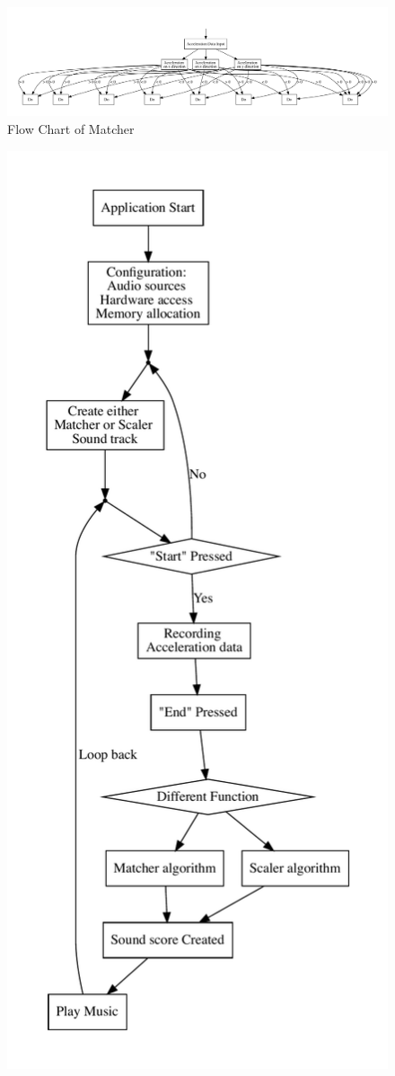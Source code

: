 \begin{figure}[H]
\centering
\includegraphics[width=1\textwidth]{figWR/ma}
\caption{Flow Chart of Matcher}
\label{FlowMatcher}
\end{figure}

\begin{figure}[H]
\centering
\includegraphics[width=1\textwidth]{figWR/sc}

\end{figure}
